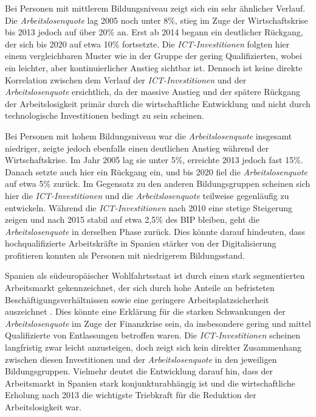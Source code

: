 Bei Personen mit mittlerem Bildungsniveau zeigt sich ein sehr ähnlicher Verlauf. Die 
\textit{Arbeitslosenquote} lag 2005 noch unter 8\%, stieg im Zuge der Wirtschaftskrise bis 2013 
jedoch auf über 20\% an. Erst ab 2014 begann ein deutlicher Rückgang, der sich bis 2020 auf etwa 
10\% fortsetzte. Die \textit{\ac{ICT}-Investitionen} folgten hier einem vergleichbaren Muster wie 
in der Gruppe der gering Qualifizierten, wobei ein leichter, aber kontinuierlicher Anstieg 
sichtbar ist. Dennoch ist keine direkte Korrelation zwischen dem Verlauf der 
\textit{\ac{ICT}-Investitionen} und der \textit{Arbeitslosenquote} ersichtlich, da der massive 
Anstieg und der spätere Rückgang der Arbeitslosigkeit primär durch die wirtschaftliche 
Entwicklung und nicht durch technologische Investitionen bedingt zu sein scheinen.

Bei Personen mit hohem Bildungsniveau war die \textit{Arbeitslosenquote} insgesamt niedriger, 
zeigte jedoch ebenfalls einen deutlichen Anstieg während der Wirtschaftskrise. Im Jahr 2005 lag 
sie unter 5\%, erreichte 2013 jedoch fast 15\%. Danach setzte auch hier ein Rückgang ein, und bis 
2020 fiel die \textit{Arbeitslosenquote} auf etwa 5\% zurück. Im Gegensatz zu den anderen 
Bildungsgruppen scheinen sich hier die \textit{\ac{ICT}-Investitionen} und die 
\textit{Arbeitslosenquote} teilweise gegenläufig zu entwickeln. Während die 
\textit{\ac{ICT}-Investitionen} nach 2010 eine stetige Steigerung zeigen und nach 2015 stabil auf 
etwa 2,5\% des BIP bleiben, geht die \textit{Arbeitslosenquote} in derselben Phase zurück. Dies 
könnte darauf hindeuten, dass hochqualifizierte Arbeitskräfte in Spanien stärker von der 
Digitalisierung profitieren konnten als Personen mit niedrigerem Bildungsstand.

Spanien als südeuropäischer Wohlfahrtsstaat ist durch einen stark segmentierten Arbeitsmarkt 
gekennzeichnet, der sich durch hohe Anteile an befristeten Beschäftigungsverhältnissen sowie eine 
geringere Arbeitsplatzsicherheit auszeichnet \parencite[vgl.][S. F160–F163]{bentolila2012two}. 
Dies könnte eine Erklärung für die starken Schwankungen der \textit{Arbeitslosenquote} im Zuge 
der Finanzkrise sein, da insbesondere gering und mittel Qualifizierte von Entlassungen betroffen 
waren. Die \textit{\ac{ICT}-Investitionen} scheinen langfristig zwar leicht anzusteigen, doch 
zeigt sich kein direkter Zusammenhang zwischen diesen Investitionen und der 
\textit{Arbeitslosenquote} in den jeweiligen Bildungsgruppen. Vielmehr deutet die Entwicklung 
darauf hin, dass der Arbeitsmarkt in Spanien stark konjunkturabhängig ist und die wirtschaftliche 
Erholung nach 2013 die wichtigste Triebkraft für die Reduktion der Arbeitslosigkeit war.

